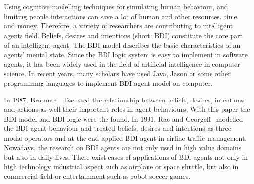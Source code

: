 \section{}%
Using cognitive modelling techniques for simulating human behaviour, and limiting people interactions can save a lot of human and other resources, time and money.
Therefore, a variety of researchers are contributing to intelligent agents field.
Beliefs, desires and intentions (short: BDI) constitute the core part of an intelligent agent.
The BDI model describes the basic characteristics of an agents' mental state.
Since the BDI logic system is easy to implement in software agents, it has been widely used in the field of artificial intelligence in computer science.
In recent years, many scholars have used Java, Jason or some other programming languages to implement BDI agent model on computer.

In 1987, Bratman~\cite{MICHAEL_PlansResource_1988} discussed the relationship between beliefs, desires, intentions and actions as well their important roles in agent behaviours.
With this paper the BDI model and BDI logic were the found.
In 1991, Rao and Georgeff~\cite{Michael_BDIAgency_1999} modelled the BDI agent behaviour and treated beliefs, desires and intentions as three modal operators and at the end applied BDI agent in airline traffic management.
Nowadays, the research on BDI agents are not only used in high value domains but also in daily lives.
There exist cases of applications of BDI agents not only in high technology industrial aspect such as airplane or space shuttle, but also in commercial field or entertainment such as robot soccer games.


